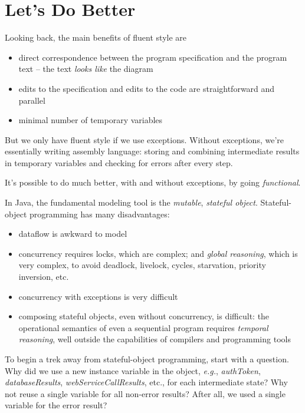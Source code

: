 \documentclass[11pt]{article}
\begin{document}
\section{Let's Do Better}
\label{sec-3}

Looking back, the main benefits of fluent style are
\begin{itemize}
\item direct correspondence between the program specification and the
program text -- the text \emph{looks like} the diagram
\item edits to the specification and edits to the code are
straightforward and parallel
\item minimal number of temporary variables
\end{itemize}

But we only have fluent style if we use exceptions. Without
exceptions, we're essentially writing assembly language: storing and
combining intermediate results in temporary variables and checking
for errors after every step.

It's possible to do much better, with
and without exceptions, by going \emph{functional}.

In Java, the fundamental modeling tool is the \emph{mutable}, \emph{stateful
object}. Stateful-object programming has many disadvantages:
\begin{itemize}
\item dataflow is awkward to model
\item concurrency requires locks, which are complex; and \emph{global
reasoning}, which is very complex, to avoid deadlock, livelock,
cycles, starvation, priority inversion, etc.
\item concurrency with exceptions is very difficult
\item composing stateful objects, even without concurrency, is
difficult: the operational semantics of even a sequential program
requires \emph{temporal reasoning}, well outside the capabilities of
compilers and programming tools
\end{itemize}

To begin a trek away from stateful-object programming, start with a
question. Why did we use a new instance variable in the object,
\emph{e.g.}, \emph{authToken}, \emph{databaseResults}, \emph{webServiceCallResults},
etc., for each intermediate state? Why not reuse a single variable
for all non-error results? After all, we used a single variable for
the error result?
\end{document}
